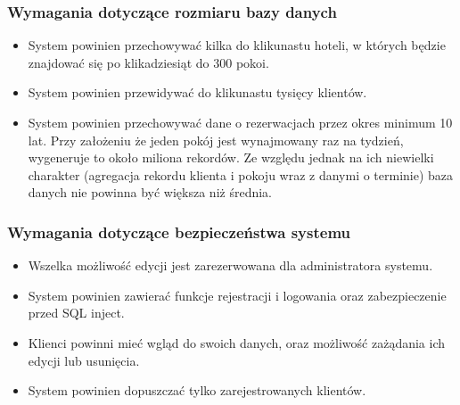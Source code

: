 \documentclass[]{article}
\begin{document}
	\subsubsection{Wymagania dotyczące rozmiaru bazy danych}
	\begin{itemize} 
	\item System powinien przechowywać kilka do klikunastu hoteli, w których będzie
	znajdować się po klikadziesiąt do 300 pokoi.
 	\item System powinien przewidywać do klikunastu tysięcy klientów.
	\item System powinien przechowywać dane o rezerwacjach przez okres minimum 10 lat. Przy założeniu że jeden pokój jest wynajmowany raz na tydzień, wygeneruje to około miliona rekordów. Ze względu jednak na ich niewielki charakter (agregacja rekordu klienta i pokoju wraz z danymi o terminie) baza danych nie powinna być większa niż średnia.
	\end{itemize}
	\subsubsection{Wymagania dotyczące bezpieczeństwa systemu}
	\begin{itemize} 
	\item Wszelka możliwość edycji jest zarezerwowana dla administratora systemu.
	\item System powinien zawierać funkcje rejestracji i logowania oraz zabezpieczenie
	przed SQL inject.
	\item Klienci powinni mieć wgląd do swoich danych, oraz możliwość zażądania ich
	edycji lub usunięcia.
	\item System powinien dopuszczać tylko zarejestrowanych klientów.
  	\end{itemize}
\end{document}
